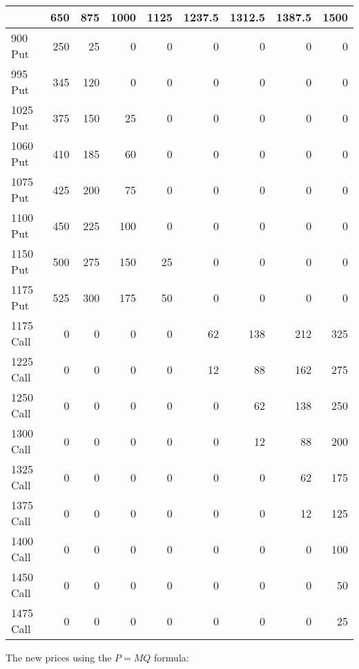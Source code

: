 \documentclass{article}
\begin{document}
\begin{tabular}{lrrrrrrrr}
    \toprule
              & 650 & 875 & 1000 & 1125 & 1237.5 & 1312.5 & 1387.5 & 1500 \\
    \midrule
    900 Put   & 250 & 25  & 0    & 0    & 0      & 0      & 0      & 0    \\
    995 Put   & 345 & 120 & 0    & 0    & 0      & 0      & 0      & 0    \\
    1025 Put  & 375 & 150 & 25   & 0    & 0      & 0      & 0      & 0    \\
    1060 Put  & 410 & 185 & 60   & 0    & 0      & 0      & 0      & 0    \\
    1075 Put  & 425 & 200 & 75   & 0    & 0      & 0      & 0      & 0    \\
    1100 Put  & 450 & 225 & 100  & 0    & 0      & 0      & 0      & 0    \\
    1150 Put  & 500 & 275 & 150  & 25   & 0      & 0      & 0      & 0    \\
    1175 Put  & 525 & 300 & 175  & 50   & 0      & 0      & 0      & 0    \\
    1175 Call & 0   & 0   & 0    & 0    & 62     & 138    & 212    & 325  \\
    1225 Call & 0   & 0   & 0    & 0    & 12     & 88     & 162    & 275  \\
    1250 Call & 0   & 0   & 0    & 0    & 0      & 62     & 138    & 250  \\
    1300 Call & 0   & 0   & 0    & 0    & 0      & 12     & 88     & 200  \\
    1325 Call & 0   & 0   & 0    & 0    & 0      & 0      & 62     & 175  \\
    1375 Call & 0   & 0   & 0    & 0    & 0      & 0      & 12     & 125  \\
    1400 Call & 0   & 0   & 0    & 0    & 0      & 0      & 0      & 100  \\
    1450 Call & 0   & 0   & 0    & 0    & 0      & 0      & 0      & 50   \\
    1475 Call & 0   & 0   & 0    & 0    & 0      & 0      & 0      & 25   \\
    \bottomrule
\end{tabular}



The new prices using the $P=MQ$ formula:
\end{document}
